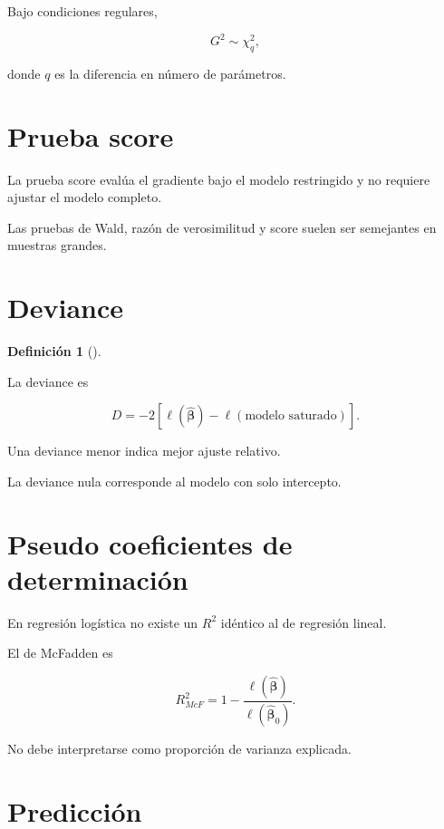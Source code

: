 \documentclass[
  spanish,
  11pt,
  letterpaper,
  DIV=11,
  numbers=noendperiod]{scrreprt}
\theoremstyle{definition}
\newtheorem{definition}{Definición}[chapter]
\theoremstyle{plain}
\theoremstyle{definition}
\theoremstyle{remark}
\begin{document}
Bajo condiciones regulares,

\[
G^2\sim\chi^2_q,
\]

donde \(q\) es la diferencia en número de parámetros.

\section{Prueba score}\label{prueba-score}

La prueba score evalúa el gradiente bajo el modelo restringido y no
requiere ajustar el modelo completo.

Las pruebas de Wald, razón de verosimilitud y score suelen ser
semejantes en muestras grandes.

\section{Deviance}\label{deviance}

\begin{definition}[]\protect\hypertarget{def-deviance-logistica}{}\label{def-deviance-logistica}

La deviance es

\[
D
=
-2
\left[
\ell(\widehat{\boldsymbol{\beta}})
-
\ell(\text{modelo saturado})
\right].
\]

\end{definition}

Una deviance menor indica mejor ajuste relativo.

La deviance nula corresponde al modelo con solo intercepto.

\section{Pseudo coeficientes de
determinación}\label{pseudo-coeficientes-de-determinaciuxf3n}

En regresión logística no existe un \(R^2\) idéntico al de regresión
lineal.

El de McFadden es

\[
R^2_{McF}
=
1-
\frac{
\ell(\widehat{\boldsymbol{\beta}})
}{
\ell(\widehat{\boldsymbol{\beta}}_0)
}.
\]

No debe interpretarse como proporción de varianza explicada.

\section{Predicción}\label{predicciuxf3n}
\end{document}
